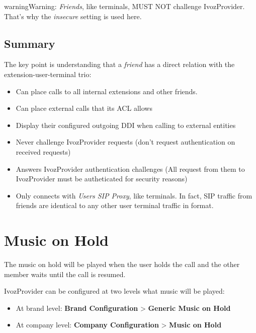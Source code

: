 \documentclass[letterpaper,10pt,english]{sphinxmanual}
\begin{document}
\begin{notice}{warning}{Warning:}
\emph{Friends}, like terminals, MUST NOT challenge IvozProvider. That's
why the \emph{insecure} setting is used here.
\end{notice}


\subsection{Summary}
\label{pbx_features/friends:summary}
The key point is understanding that a \emph{friend} has a direct relation with the
extension-user-terminal trio:
\begin{itemize}
\item {} 
Can place calls to all internal extensions and other friends.

\item {} 
Can place external calls that its ACL allows

\item {} 
Display their configured outgoing DDI when calling to external entities

\item {} 
Never challenge IvozProvider requests (don't request authentication on received requests)

\item {} 
Answers IvozProvider authentication challenges (All request from them to
IvozProvider must be autheticated for security reasons)

\item {} 
Only connects with \emph{Users SIP Proxy}, like terminals. In fact, SIP traffic from
friends are identical to any other user terminal traffic in format.

\end{itemize}


\section{Music on Hold}
\label{pbx_features/music_on_hold:music-on-hold}\label{pbx_features/music_on_hold::doc}\label{pbx_features/music_on_hold:musiconhold}
The music on hold will be played when the user holds the call and the other
member waits until the call is resumed.

IvozProvider can be configured at two levels what music will be played:
\begin{itemize}
\item {} 
At brand level: \textbf{Brand Configuration} \textgreater{} \textbf{Generic Music on Hold}

\item {} 
At company level: \textbf{Company Configuration} \textgreater{} \textbf{Music on Hold}

\end{itemize}
\end{document}
